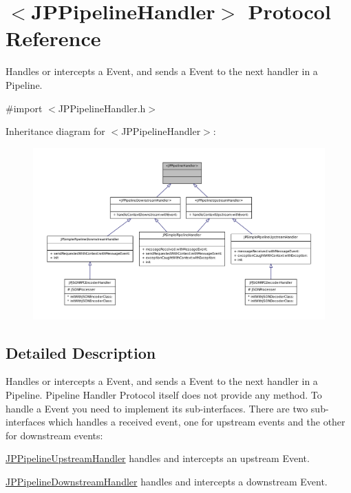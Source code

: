 \hypertarget{a00029}{
\section{$<$JPPipelineHandler$>$ Protocol Reference}
\label{a00029}
}


Handles or intercepts a Event, and sends a Event to the next handler in a Pipeline.  




{\ttfamily \#import $<$JPPipelineHandler.h$>$}



Inheritance diagram for $<$JPPipelineHandler$>$:\nopagebreak
\begin{figure}[H]
\begin{center}
\leavevmode
\includegraphics[width=400pt]{a00140}
\end{center}
\end{figure}


\subsection{Detailed Description}
Handles or intercepts a Event, and sends a Event to the next handler in a Pipeline. Pipeline Handler Protocol itself does not provide any method. To handle a Event you need to implement its sub-\/interfaces. There are two sub-\/interfaces which handles a received event, one for upstream events and the other for downstream events:


\begin{DoxyItemize}
\item \hyperlink{a00035}{JPPipelineUpstreamHandler} handles and intercepts an upstream Event.
\item \hyperlink{a00021}{JPPipelineDownstreamHandler} handles and intercepts a downstream Event.
\end{DoxyItemize}

